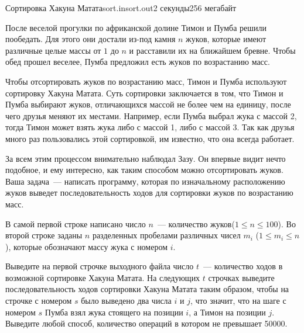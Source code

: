 \begin{problem}{Сортировка Хакуна Матата}{sort.in}{sort.out}{2 секунды}{256 мегабайт}


После веселой прогулки по африканской долине Тимон и Пумба решили пообедать. 
Для этого они достали из-под камня $n$ жуков, которые имеют 
различные целые массы от $1$ до $n$ и расставили их на ближайшем
бревне. Чтобы обед прошел веселее, Пумба предложил есть жуков по возрастанию масс. 

Чтобы отсортировать жуков по возрастанию масс, Тимон и Пумба используют сортировку Хакуна Матата.
Суть сортировки заключается в том, что Тимон и Пумба выбирают жуков, отличающихся массой не более чем на единицу, 
после чего друзья меняют их местами. Например, если Пумба выбрал жука с массой 2,
тогда Тимон может взять жука либо с массой 1, либо с массой 3. Так как друзья много раз пользовались 
этой сортировкой, им известно, что она всегда работает.
 
За всем этим процессом внимательно наблюдал Зазу. Он впервые видит нечто подобное, и ему интересно, как 
таким способом можно отсортировать жуков. Ваша задача~--- написать программу, которая по изначальному расположению жуков
выведет последовательность ходов для сортировки жуков по возрастанию масс.

\InputFile
В самой первой строке написано число $n$~--- количество жуков($1 \le n \le 100$).
Во второй строке заданы $n$ разделенных пробелами различных чисел $m_i$ ($1 \le m_i \le n$), которые обозначают массу жука 
с номером $i$.

\OutputFile
Выведите на первой строчке выходного файла число $t$~--- количество ходов в возможной сортировке Хакуна Матата.
На следующих $t$ строчках выведите последовательность ходов сортировки Хакуна Матата таким образом, чтобы на строчке 
с номером $s$ было выведено два числа $i$ и $j$, что значит, что на шаге с номером $s$ Пумба взял жука 
стоящего на позиции $i$, а Тимон на позиции $j$. Выведите любой способ, количество операций в котором не превышает 50000.


\Example
\begin{example}%
%
\end{example}

\end{problem}
